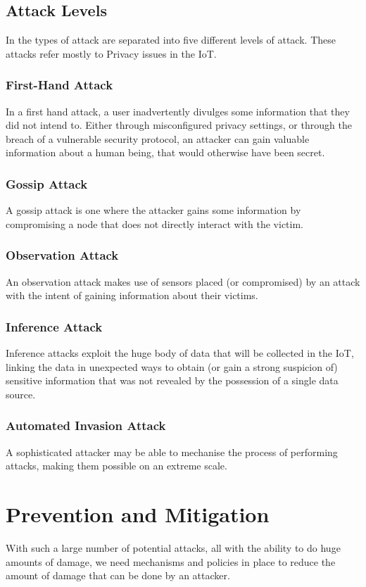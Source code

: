 \documentclass[10pt,journal,compsoc]{IEEEtran}
\begin{document}
\subsection{Attack Levels}
In \cite{Elkhodr2013} the types of attack are separated into five different
levels of attack. These attacks refer mostly to Privacy issues in the IoT.

\subsubsection{First-Hand Attack}
In a first hand attack, a user inadvertently divulges some information that
they did not intend to. Either through misconfigured privacy settings, or
through the breach of a vulnerable security protocol, an attacker can gain
valuable information about a human being, that would otherwise have been
secret.  

\subsubsection{Gossip Attack}
A gossip attack is one where the attacker gains some information by
compromising a node that does not directly interact with the victim. 

\subsubsection{Observation Attack}
An observation attack makes use of sensors placed (or compromised) by an attack
with the intent of gaining information about their victims.

\subsubsection{Inference Attack}
Inference attacks exploit the huge body of data that will be collected in the
IoT, linking the data in unexpected ways to obtain (or gain a strong suspicion
of) sensitive information that was not revealed by the possession of a single
data source. 

\subsubsection{Automated Invasion Attack}
A sophisticated attacker may be able to mechanise the process of performing
attacks, making them possible on an extreme scale. 

\section{Prevention and Mitigation}
With such a large number of potential attacks, all with the ability to do huge
amounts of damage, we need mechanisms and policies in place to reduce the
amount of damage that can be done by an attacker. 
\end{document}

